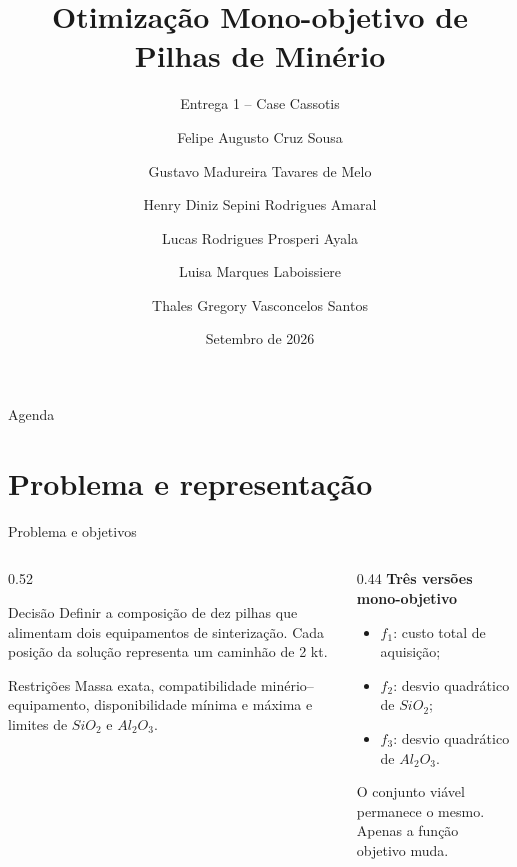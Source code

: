 \documentclass[aspectratio=169]{beamer}
\title[TP1 -- Cassotis]{Otimização Mono-objetivo de Pilhas de Minério}
\subtitle{Entrega 1 -- Case Cassotis}
\author[Grupo 1]{%
Felipe Augusto Cruz Sousa \and Gustavo Madureira Tavares de Melo \and
Henry Diniz Sepini Rodrigues Amaral \and Lucas Rodrigues Prosperi Ayala \and
Luisa Marques Laboissiere \and Thales Gregory Vasconcelos Santos}
\institute[UFMG]{Universidade Federal de Minas Gerais -- Escola de Engenharia}
\date{Setembro de 2026}
\begin{document}
\begin{frame}
    \titlepage
\end{frame}

\begin{frame}{Agenda}
    \tableofcontents
\end{frame}

\section{Problema e representação}
\begin{frame}{Problema e objetivos}
\begin{columns}[T]
    \begin{column}{0.52\textwidth}
        \begin{block}{Decisão}
            Definir a composição de dez pilhas que alimentam dois equipamentos
            de sinterização. Cada posição da solução representa um caminhão de
            2 kt.
        \end{block}

        \begin{exampleblock}{Restrições}
            Massa exata, compatibilidade minério--equipamento, disponibilidade
            mínima e máxima e limites de $SiO_2$ e $Al_2O_3$.
        \end{exampleblock}
    \end{column}

    \begin{column}{0.44\textwidth}
        \textbf{Três versões mono-objetivo}
        \begin{itemize}
            \item $f_1$: custo total de aquisição;
            \item $f_2$: desvio quadrático de $SiO_2$;
            \item $f_3$: desvio quadrático de $Al_2O_3$.
        \end{itemize}

        \vspace{0.4cm}
        O conjunto viável permanece o mesmo. Apenas a função objetivo muda.
    \end{column}
\end{columns}
\end{frame}
\end{document}
